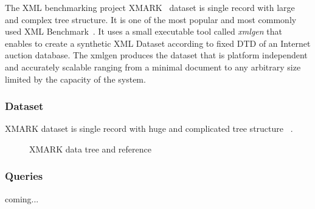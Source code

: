 The XML benchmarking project XMARK~\cite{xmark/original} dataset is single record with large and complex tree structure. It is one of the most popular and most commonly used XML Benchmark~\cite{xmark/mlynkova2008xml}. It uses a small executable tool called  \textit{xmlgen} that enables to create a synthetic XML Dataset according to fixed DTD of an Internet auction database. The xmlgen produces the dataset that is platform independent and accurately scalable ranging from a minimal document to any arbitrary size limited by the capacity of the system. 
\subsubsection{Dataset}
\label{xmark-dataset}
	XMARK dataset is single record with huge and complicated tree structure ~\cite{xmark/VIST}. 


\newpage
\begin{figure}
	\centering
	\centering
	\caption{XMARK data tree and reference}
	\label{fig:xmark-tree-reference}
\end{figure}

\subsubsection{Queries}
\label{xmark-queries}
coming...